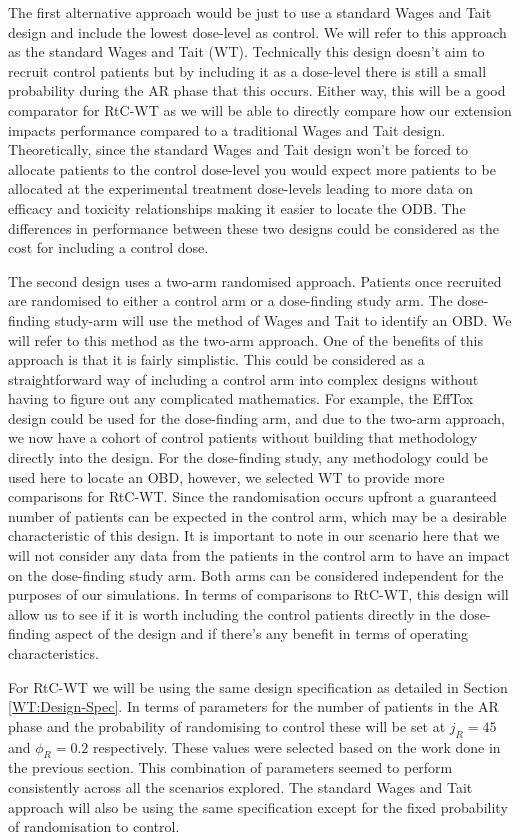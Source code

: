 The first alternative approach would be just to use a standard Wages and Tait design and include the lowest dose-level as control. We will refer to this approach as the standard Wages and Tait (WT). Technically this design doesn't aim to recruit control patients but by including it as a dose-level there is still a small probability during the AR phase that this occurs. Either way, this will be a good comparator for RtC-WT as we will be able to directly compare how our extension impacts performance compared to a traditional Wages and Tait design. Theoretically, since the standard Wages and Tait design won't be forced to allocate patients to the control dose-level you would expect more patients to be allocated at the experimental treatment dose-levels leading to more data on efficacy and toxicity relationships making it easier to locate the ODB. The differences in performance between these two designs could be considered as the cost for including a control dose. 
 
 The second design uses a two-arm randomised approach. Patients once recruited are randomised to either a control arm or a dose-finding study arm. The dose-finding study-arm will use the method of Wages and Tait to identify an OBD. We will refer to this method as the two-arm approach. One of the benefits of this approach is that it is fairly simplistic. This could be considered as a straightforward way of including a control arm into complex designs without having to figure out any complicated mathematics. For example, the EffTox design could be used for the dose-finding arm, and due to the two-arm approach, we now have a cohort of control patients without building that methodology directly into the design. For the dose-finding study, any methodology could be used here to locate an OBD, however, we selected WT to provide more comparisons for RtC-WT. Since the randomisation occurs upfront a guaranteed number of patients can be expected in the control arm, which may be a desirable characteristic of this design. It is important to note in our scenario here that we will not consider any data from the patients in the control arm to have an impact on the dose-finding study arm. Both arms can be considered independent for the purposes of our simulations. In terms of comparisons to RtC-WT, this design will allow us to see if it is worth including the control patients directly in the dose-finding aspect of the design and if there's any benefit in terms of operating characteristics.  
 
 For RtC-WT we will be using the same design specification as detailed in Section \ref{WT:Design-Spec}. In terms of parameters for the number of patients in the AR phase and the probability of randomising to control these will be set at $j_R = 45 $ and $\phi_R = 0.2 $ respectively. These values were selected based on the work done in the previous section. This combination of parameters seemed to perform consistently across all the scenarios explored. The standard Wages and Tait approach will also be using the same specification except for the fixed probability of randomisation to control.
 
